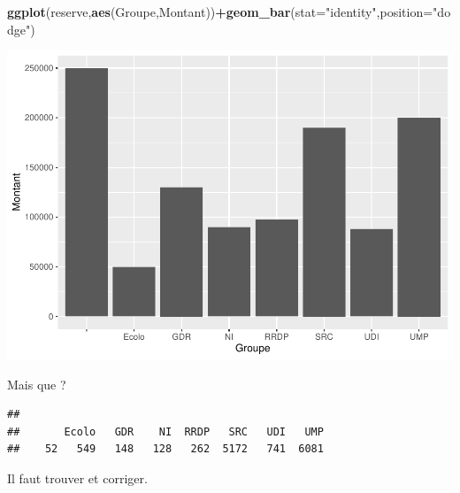 \documentclass[
]{book}
\newenvironment{Shaded}{\begin{snugshade}}{\end{snugshade}}
\newcommand{\AttributeTok}[1]{\textcolor[rgb]{0.13,0.29,0.53}{#1}}
\newcommand{\FunctionTok}[1]{\textcolor[rgb]{0.13,0.29,0.53}{\textbf{#1}}}
\newcommand{\NormalTok}[1]{#1}
\newcommand{\OtherTok}[1]{\textcolor[rgb]{0.56,0.35,0.01}{#1}}
\newcommand{\SpecialCharTok}[1]{\textcolor[rgb]{0.81,0.36,0.00}{\textbf{#1}}}
\newcommand{\StringTok}[1]{\textcolor[rgb]{0.31,0.60,0.02}{#1}}
\begin{document}
\begin{Shaded}
\begin{Highlighting}[]
\FunctionTok{ggplot}\NormalTok{(reserve,}\FunctionTok{aes}\NormalTok{(Groupe,Montant))}\SpecialCharTok{+}\FunctionTok{geom\_bar}\NormalTok{(}\AttributeTok{stat=}\StringTok{"identity"}\NormalTok{,}\AttributeTok{position=}\StringTok{"dodge"}\NormalTok{)}
\end{Highlighting}
\end{Shaded}

\includegraphics{_main_files/figure-latex/reserve4-1.pdf}

Mais que ?

\begin{Shaded}
\end{Shaded}

\begin{verbatim}
## 
##       Ecolo   GDR    NI  RRDP   SRC   UDI   UMP 
##    52   549   148   128   262  5172   741  6081
\end{verbatim}

Il faut trouver et corriger.

\begin{Shaded}
\end{Shaded}
\end{document}

